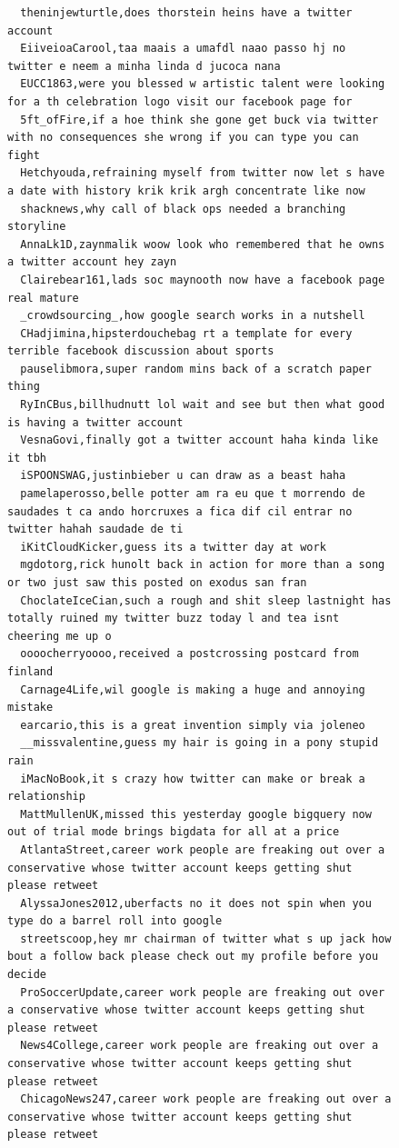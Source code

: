 \begin{figure}[htpb]
\begin{verbatim}
  theninjewturtle,does thorstein heins have a twitter account
  EiiveioaCarool,taa maais a umafdl naao passo hj no twitter e neem a minha linda d jucoca nana
  EUCC1863,were you blessed w artistic talent were looking for a th celebration logo visit our facebook page for
  5ft_ofFire,if a hoe think she gone get buck via twitter with no consequences she wrong if you can type you can fight
  Hetchyouda,refraining myself from twitter now let s have a date with history krik krik argh concentrate like now
  shacknews,why call of black ops needed a branching storyline
  AnnaLk1D,zaynmalik woow look who remembered that he owns a twitter account hey zayn
  Clairebear161,lads soc maynooth now have a facebook page real mature
  _crowdsourcing_,how google search works in a nutshell
  CHadjimina,hipsterdouchebag rt a template for every terrible facebook discussion about sports
  pauselibmora,super random mins back of a scratch paper thing
  RyInCBus,billhudnutt lol wait and see but then what good is having a twitter account
  VesnaGovi,finally got a twitter account haha kinda like it tbh
  iSPOONSWAG,justinbieber u can draw as a beast haha
  pamelaperosso,belle potter am ra eu que t morrendo de saudades t ca ando horcruxes a fica dif cil entrar no twitter hahah saudade de ti
  iKitCloudKicker,guess its a twitter day at work
  mgdotorg,rick hunolt back in action for more than a song or two just saw this posted on exodus san fran
  ChoclateIceCian,such a rough and shit sleep lastnight has totally ruined my twitter buzz today l and tea isnt cheering me up o
  oooocherryoooo,received a postcrossing postcard from finland
  Carnage4Life,wil google is making a huge and annoying mistake
  earcario,this is a great invention simply via joleneo
  __missvalentine,guess my hair is going in a pony stupid rain
  iMacNoBook,it s crazy how twitter can make or break a relationship
  MattMullenUK,missed this yesterday google bigquery now out of trial mode brings bigdata for all at a price
  AtlantaStreet,career work people are freaking out over a conservative whose twitter account keeps getting shut please retweet
  AlyssaJones2012,uberfacts no it does not spin when you type do a barrel roll into google
  streetscoop,hey mr chairman of twitter what s up jack how bout a follow back please check out my profile before you decide
  ProSoccerUpdate,career work people are freaking out over a conservative whose twitter account keeps getting shut please retweet
  News4College,career work people are freaking out over a conservative whose twitter account keeps getting shut please retweet
  ChicagoNews247,career work people are freaking out over a conservative whose twitter account keeps getting shut please retweet

\end{verbatim}
\end{figure}
